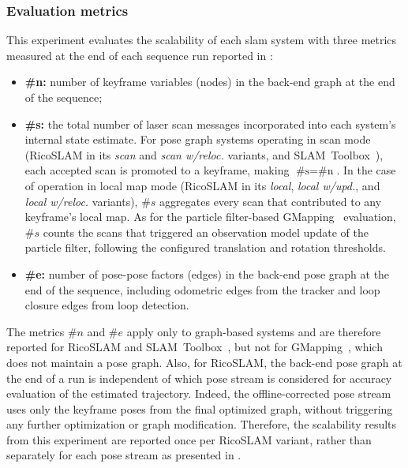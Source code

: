 \subsubsection{Evaluation metrics}
\label{sec:slam:results:relocalization:metrics}

This experiment evaluates the scalability of each \gls{slam} system with
three metrics measured at the end of each sequence run reported in
:
\begin{itemize}
\item \textbf{\#n:} number of keyframe variables (nodes) in the back-end graph
      at the end of the sequence;
\item \textbf{\#s:} the total number of laser scan messages incorporated
      into each system's internal state estimate.
      For pose graph systems operating
      in scan mode (RicoSLAM in its \emph{scan} and \emph{scan w/reloc.}
      variants, and SLAM~Toolbox~\cite{macenski-jambrecic:joss:2021}),
      each accepted scan is promoted to a keyframe,
      making $\text{\#s} = \text{\#n}$.
      In the case of operation in local map mode (RicoSLAM
      in its \emph{local}, \emph{local w/upd.}, and
      \emph{local w/reloc.} variants), $\#s$ aggregates every scan that
      contributed to any keyframe's local map.
      As for the particle filter-based GMapping~\cite{grisetti:tro:2007}
      evaluation, $\#s$ counts the scans that
      triggered an observation model update of the particle filter,
      following the configured translation and rotation thresholds.
\item \textbf{\#e:} number of pose-pose factors (edges) in the back-end pose
      graph at the end of the sequence, including odometric edges from the
      tracker and loop closure edges from loop detection.
\end{itemize}

The metrics $\#n$ and $\#e$ apply only to graph-based systems and are
therefore reported for RicoSLAM and
SLAM~Toolbox~\cite{macenski-jambrecic:joss:2021}, but not for
GMapping~\cite{grisetti:tro:2007}, which does not maintain a pose graph.
Also, for RicoSLAM, the back-end pose graph at the end of a run is independent
of which pose stream is considered for accuracy evaluation of the estimated
trajectory. Indeed, the offline-corrected pose stream uses only the keyframe
poses from the final optimized graph, without triggering any further
optimization or graph modification. Therefore, the scalability results from
this experiment are reported once per RicoSLAM variant, rather than
separately for each pose stream as presented in
.

